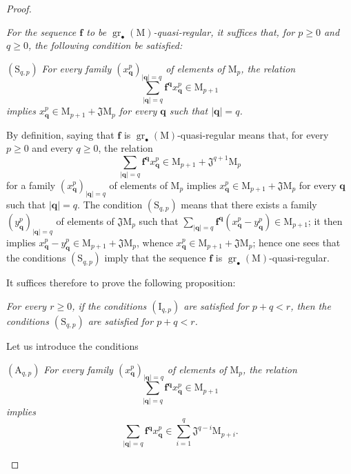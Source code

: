 \begin{proof}
\begin{env}[19.5.5.2]
\label{IV.19.5.5.2}
\emph{For the sequence $\mathbf{f}$ to be $\operatorname{gr}_\bullet(\mathrm{M})$-quasi-regular, it suffices that, for $p\geqslant 0$ and $q\geqslant 0$, the following condition be satisfied:}

$(\mathrm{S}_{q,p})$ \emph{For every family $(x_\mathbf{q}^p)_{|\mathbf{q}|=q}$ of elements of $\mathrm{M}_p$, the relation}
\[
  \textstyle\sum_{|\mathbf{q}|=q}\mathbf{f}^\mathbf{q}x_\mathbf{q}^p\in\mathrm{M}_{p+1}
\]
\emph{implies $x_\mathbf{q}^p\in\mathrm{M}_{p+1}+\mathfrak{J}\mathrm{M}_p$ for every $\mathbf{q}$ such that $|\mathbf{q}|=q$.}

By definition, saying that $\mathbf{f}$ is $\operatorname{gr}_\bullet(\mathrm{M})$-quasi-regular means that, for every $p\geqslant 0$ and every $q\geqslant 0$, the relation
\[
  \textstyle\sum_{|\mathbf{q}|=q}\mathbf{f}^\mathbf{q} x_\mathbf{q}^p\in\mathrm{M}_{p+1}+\mathfrak{J}^{q+1}\mathrm{M}_p
\]
for a family $(x_\mathbf{q}^p)_{|\mathbf{q}|=q}$ of elements of $\mathrm{M}_p$ implies $x_\mathbf{q}^p\in\mathrm{M}_{p+1}+\mathfrak{J}\mathrm{M}_p$ for every $\mathbf{q}$ such that $|\mathbf{q}|=q$. The condition $(\mathrm{S}_{q,p})$ means that there exists a family $(y_\mathbf{q}^p)_{|\mathbf{q}|=q}$ of elements of $\mathfrak{J}\mathrm{M}_p$ such that $\sum_{|\mathbf{q}|=q}\mathbf{f}^\mathbf{q}(x_\mathbf{q}^p-y_\mathbf{q}^p)\in\mathrm{M}_{p+1}$; it then implies $x_\mathbf{q}^p-y_\mathbf{q}^p\in\mathrm{M}_{p+1}+\mathfrak{J}\mathrm{M}_p$, whence $x_\mathbf{q}^p\in\mathrm{M}_{p+1}+\mathfrak{J}\mathrm{M}_p$; hence one sees that the conditions $(\mathrm{S}_{q,p})$ imply that the sequence $\mathbf{f}$ is $\operatorname{gr}_\bullet(\mathrm{M})$-quasi-regular.
\end{env}

It suffices therefore to prove the following proposition:

\begin{env}[19.5.5.3]
\label{IV.19.5.5.3}
\emph{For every $r\geqslant 0$, if the conditions $(\mathrm{I}_{q,p})$ are satisfied for $p+q<r$, then the conditions $(\mathrm{S}_{q,p})$ are satisfied for $p+q<r$.}

Let us introduce the conditions

$(\mathrm{A}_{q,p})$ \emph{For every family $(x_\mathbf{q}^p)_{|\mathbf{q}|=q}$ of elements of $\mathrm{M}_p$, the relation}
\[
  \textstyle\sum_{|\mathbf{q}|=q}\mathbf{f}^\mathbf{q}x_\mathbf{q}^p\in\mathrm{M}_{p+1}
\]
\emph{implies}
\[
  \textstyle\sum_{|\mathbf{q}|=q}\mathbf{f}^\mathbf{q}x_\mathbf{q}^p
  \in\textstyle\sum_{i=1}^{q}\mathfrak{J}^{q-i}\mathrm{M}_{p+i}.
\]


\end{env}
\end{proof}

